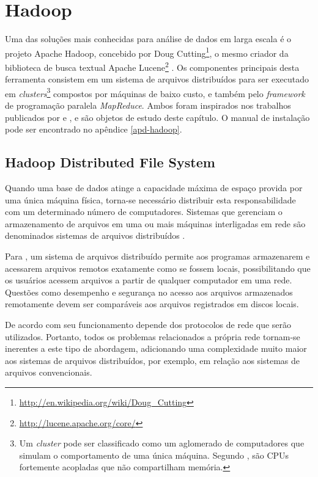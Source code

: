 \chapter{Hadoop}
\label{cap:hadoop}

Uma das soluções mais conhecidas para análise de dados em larga escala é o projeto Apache Hadoop, concebido por Doug Cutting\footnote{\url{http://en.wikipedia.org/wiki/Doug_Cutting}}, o mesmo criador da biblioteca de busca textual Apache Lucene\footnote{\url{http://lucene.apache.org/core/}} \cite{white2012}. Os componentes principais desta ferramenta consistem em um sistema de arquivos distribuídos para ser executado em \textit{clusters}\footnote{Um \textit{cluster} pode ser classificado como um aglomerado de computadores que simulam o comportamento de uma única máquina. Segundo , são CPUs fortemente acopladas que não compartilham memória.} compostos por máquinas de baixo custo, e também pelo \textit{framework} de programação paralela \textit{MapReduce}. Ambos foram inspirados nos trabalhos publicados por  e , e são objetos de estudo deste capítulo. O manual de instalação pode ser encontrado no apêndice \ref{apd-hadoop}.

\section{Hadoop Distributed File System}

Quando uma base de dados atinge a capacidade máxima de espaço provida por uma única máquina física, torna-se necessário distribuir esta responsabilidade com um determinado número de computadores. Sistemas que gerenciam o armazenamento de arquivos em uma ou mais máquinas interligadas em rede são denominados sistemas de arquivos distribuídos \cite{white2012}. 

Para , um sistema de arquivos distribuído permite aos programas armazenarem e acessarem arquivos remotos exatamente como se fossem locais, possibilitando que os usuários acessem arquivos a partir de qualquer computador em uma rede. Questões como desempenho e segurança no acesso aos arquivos armazenados remotamente devem ser comparáveis aos arquivos registrados em discos locais.

De acordo com  seu funcionamento depende dos protocolos de rede que serão utilizados. Portanto, todos os problemas relacionados a própria rede tornam-se inerentes a este tipo de abordagem, adicionando uma complexidade muito maior aos sistemas de arquivos distribuídos, por exemplo, em relação aos sistemas de arquivos convencionais.

